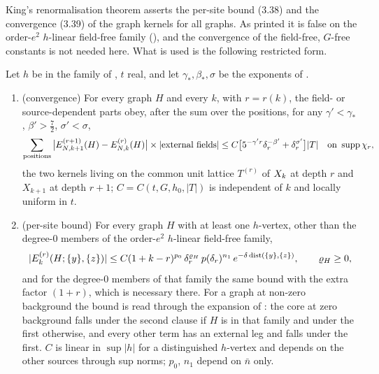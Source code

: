 King's renormalisation theorem \cite[Thm.~3.5]{K1} asserts the per-site bound (3.38) and the convergence (3.39) of the graph kernels for all graphs. As printed it is false on the order-$e^2$ $h$-linear field-free family (), and the convergence of the field-free, $G$-free constants is not needed here. What is used is the following restricted form.

\begin{proposition}\label{rot:prop:H6R}
Let $h$ be in the family of , $t$ real, and let $\gamma_*,\beta_*,\sigma$ be the exponents of \cite[Thm.~3.4]{K1}.
\begin{enumerate}[label=\textup{(\roman*)},leftmargin=*]
\item \textup{(convergence)} For every graph $H$ and every $k$, with $r=r(k)$, the field- or source-dependent parts obey, after the sum over the positions, for any $\gamma'<\gamma_*$, $\beta'>\frac72$, $\sigma'<\sigma$,
\[
\sum_{\text{positions}}\big|E^{(r+1)}_{N,k+1}(H)-E^{(r)}_{N,k}(H)\big|\times|\text{external fields}|\le C\big[5^{-\gamma'r}\delta_r^{-\beta'}+\delta_r^{\sigma'}\big]|T|\quad\text{on }\operatorname{supp}\chi_r,
\]
the two kernels living on the common unit lattice $T^{(r)}$ of $X_k$ at depth $r$ and $X_{k+1}$ at depth $r+1$; $C=C(t,G,h_0,|T|)$ is independent of $k$ and locally uniform in $t$.
\item \textup{(per-site bound)} For every graph $H$ with at least one $h$-vertex, other than the degree-$0$ members of the order-$e^2$ $h$-linear field-free family,
\[
|E^{(r)}_k(H;\{y\},\{z\})|\le C(1+k-r)^{p_0}\,\delta_r^{\varrho_H}\,p(\delta_r)^{n_1}\,e^{-\delta\operatorname{dist}(\{y\},\{z\})},\qquad\varrho_H\ge0,
\]
and for the degree-$0$ members of that family the same bound with the extra factor $(1+r)$, which is necessary there. For a graph at non-zero background the bound is read through the expansion of : the core at zero background falls under the second clause if $H$ is in that family and under the first otherwise, and every other term has an external leg and falls under the first. $C$ is linear in $\sup|h|$ for a distinguished $h$-vertex and depends on the other sources through sup norms; $p_0$, $n_1$ depend on $\bar n$ only.
\end{enumerate}
\end{proposition}

